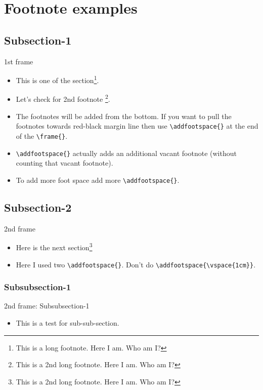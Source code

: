 \section{Footnote examples}
\subsection{Subsection-1}
\begin{frame}[fragile]{1st frame}
    \begin{itemize}
        \item This is one of the section\footnote{This is a long footnote. Here I am. Who am I?}. 
        \item Let's check for 2nd footnote \footnote{This is a 2nd long footnote. Here I am. Who am I?}.
        \item The footnotes will be added from the bottom. If you want to pull the footnotes towards red-black margin line then use \verb|\addfootspace{}| at the end of the \verb|\frame{}|.
        \item \verb|\addfootspace{}| actually adds an additional vacant footnote (without counting that vacant footnote).
        \item To add more foot space add more \verb|\addfootspace{}|. 
    \end{itemize}
\addfootspace{} %
\addfootspace{}
\end{frame}
\subsection{Subsection-2}
\begin{frame}[fragile]{2nd frame}
   \begin{itemize}
      \item Here is the next section\footnote{This is a 2nd long footnote. Here I am. Who am I?}
      \item Here I used two \verb|\addfootspace{}|. Don't do \verb|\addfootspace{\vspace{1cm}}|.
   \end{itemize}
   \addfootspace{}\addfootspace{}
\end{frame}
\subsubsection{Subsubsection-1}
\begin{frame}{2nd frame: Subsubsection-1}
\begin{itemize}
    \item This is a test for sub-sub-section.
\end{itemize}
\end{frame}
